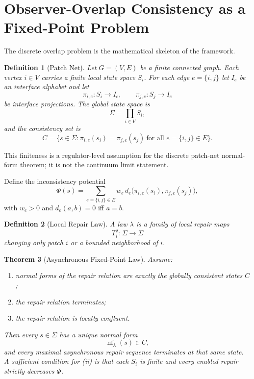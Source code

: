 \documentclass[11pt]{article}
\newtheorem{theorem}{Theorem}[section]
\newtheorem{definition}[theorem]{Definition}
\newcommand{\nf}{\operatorname{nf}}
\begin{document}
\section{Observer-Overlap Consistency as a Fixed-Point Problem}

The discrete overlap problem is the mathematical skeleton of the framework.

\begin{definition}[Patch Net]\label{def:patchnet}
Let $G=(V,E)$ be a finite connected graph. Each vertex $i\in V$ carries a finite local state space $S_i$. For each edge $e=\{i,j\}$ let $I_e$ be an interface alphabet and let
\[
\pi_{i,e}:S_i\to I_e,
\qquad
\pi_{j,e}:S_j\to I_e
\]
be interface projections. The global state space is
\[
\Sigma=\prod_{i\in V} S_i,
\]
and the consistency set is
\[
C=\bigl\{s\in\Sigma:\pi_{i,e}(s_i)=\pi_{j,e}(s_j)\ \text{for all }e=\{i,j\}\in E\bigr\}.
\]
\end{definition}

This finiteness is a regulator-level assumption for the discrete patch-net normal-form theorem; it is not the continuum limit statement.

Define the inconsistency potential
\[
\Phi(s)=\sum_{e=\{i,j\}\in E}w_e\, d_e\!\bigl(\pi_{i,e}(s_i),\pi_{j,e}(s_j)\bigr),
\]
with $w_e>0$ and $d_e(a,b)=0$ iff $a=b$.

\begin{definition}[Local Repair Law]
A law $\lambda$ is a family of local repair maps
\[
T_i^\lambda:\Sigma\to\Sigma
\]
changing only patch $i$ or a bounded neighborhood of $i$.
\end{definition}

\begin{theorem}[Asynchronous Fixed-Point Law]\label{thm:confluence}
Assume:
\begin{enumerate}[label=(\roman*),leftmargin=2em]
\item normal forms of the repair relation are exactly the globally consistent states $C$;
\item the repair relation terminates;
\item the repair relation is locally confluent.
\end{enumerate}
Then every $s\in\Sigma$ has a unique normal form
\[
\nf_\lambda(s)\in C,
\]
and every maximal asynchronous repair sequence terminates at that same state.
A sufficient condition for (ii) is that each $S_i$ is finite and every enabled repair strictly decreases $\Phi$.
\end{theorem}
\end{document}
